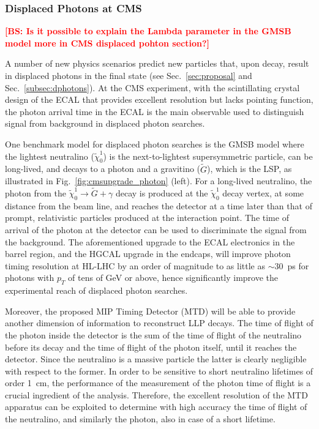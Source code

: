 \subsubsection{Displaced Photons at CMS}

{\bf \textcolor{red}{[BS: Is it possible to explain the Lambda parameter in the GMSB model more in CMS displaced pohton section?]}}

A number of new physics scenarios predict new particles that, upon decay, result in displaced photons in the final state (see Sec.~\ref{sec:proposal} and Sec.~\ref{subsec:dphotons}). At the CMS experiment, with the scintillating crystal design of the ECAL that provides excellent resolution but lacks pointing function, the photon arrival time in the ECAL is the main observable used to distinguish signal from background in displaced photon searches. 

One benchmark model for displaced photon searches is the GMSB model where the lightest neutralino ($\tilde{\chi}_0^1$) is the next-to-lightest supersymmetric particle, can be long-lived, and decays to a photon and a gravitino ($\tilde{G}$), which is the LSP, as illustrated in Fig.~\ref{fig:cmsupgrade_photon} (left). For a long-lived neutralino, the photon from the $\tilde{\chi}_0^1\to\tilde{G}+\gamma$ decay is produced at the $\tilde{\chi}_0^1$ decay vertex, at some distance from the beam line, and reaches the detector at a time later than that of prompt, relativistic particles produced at the interaction point. The time of arrival of the photon at the detector can be used to discriminate the signal from the background. The aforementioned upgrade to the ECAL electronics in the barrel region, and the HGCAL upgrade in the endcaps, will improve photon timing resolution at HL-LHC by an order of magnitude to as little as $\sim30$~ps for photons with $p_T$ of tens of GeV or above, hence significantly improve the experimental reach of displaced photon searches. 

Moreover, the proposed MIP Timing Detector (MTD) will be able to provide another dimension of information to reconstruct LLP decays. The time of flight of the photon inside the detector is the sum of the time of flight of the neutralino before its decay and the time of flight of the photon itself, until it reaches the detector. Since the neutralino is a massive particle the latter is clearly negligible with respect to the former. In order to be sensitive to short neutralino lifetimes of order 1~cm, the performance of the measurement of the photon time of flight is a crucial ingredient of the analysis. Therefore, the excellent resolution of the MTD apparatus can be exploited to determine with high accuracy the time of flight of the neutralino, and similarly the photon, also in case of a short lifetime.


